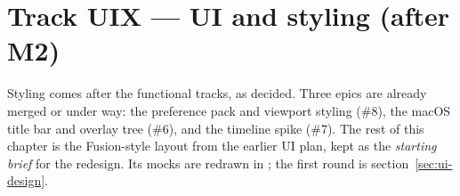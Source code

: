 \section{Track UIX --- UI and styling (after M2)}\label{sec:uix}

Styling comes after the functional tracks, as decided. Three epics are already merged or under way: the
preference pack and viewport styling (\#8), the macOS title bar and overlay tree (\#6), and the timeline
spike (\#7). The rest of this chapter is the Fusion-style layout from the earlier UI plan, kept as the
\emph{starting brief} for the redesign. Its mocks are redrawn in ; the first round is section~\ref{sec:ui-design}.

